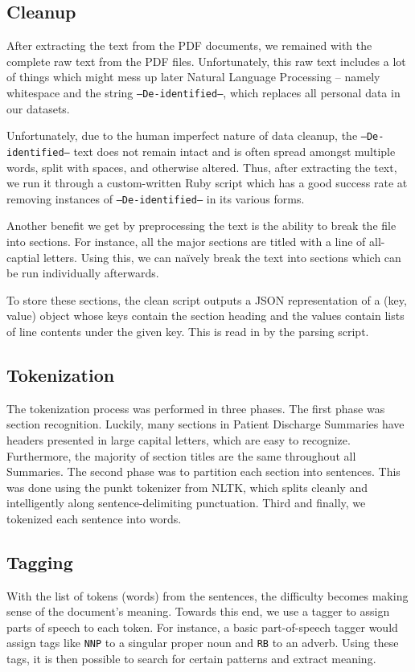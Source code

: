 \documentclass{acm_proc_article-sp}
\begin{document}
\subsection{Cleanup}
After extracting the text from the PDF documents, we remained with the complete raw text from the PDF files.
Unfortunately, this raw text includes a lot of things which might mess up later Natural Language Processing --
namely whitespace and the string \texttt{--De-identified--}, which replaces all personal data in our datasets.

Unfortunately, due to the human imperfect nature of data cleanup, the \texttt{--De-identified--} text does not remain
intact and is often spread amongst multiple words, split with spaces, and otherwise altered. Thus, after extracting
the text, we run it through a custom-written Ruby script which has a good success rate at removing instances of 
\texttt{--De-identified--} in its various forms.

Another benefit we get by preprocessing the text is the ability to break the file into sections. For instance,
all the major sections are titled with a line of all-captial letters. Using this, we can na{\"i}vely break the text
into sections which can be run individually afterwards.

To store these sections, the clean script outputs a JSON representation of a (key, value) object whose keys contain the
section heading and the values contain lists of line contents under the given key. This is read in by the parsing
script.

\subsection{Tokenization}
The tokenization process was performed in three phases. The first phase was section
recognition. Luckily, many sections in Patient Discharge Summaries have headers presented
in large capital letters, which are easy to recognize. Furthermore, the majority of
section titles are the same throughout all Summaries. The second phase was to partition
each section into sentences. This was done using the punkt tokenizer from NLTK,
which splits cleanly and intelligently along sentence-delimiting punctuation.
Third and finally, we tokenized each sentence into words.

\subsection{Tagging}
With the list of tokens (words) from the sentences, the difficulty becomes making sense of the 
document's meaning. Towards this end, we use a tagger to assign parts of speech to each
token. For instance, a basic part-of-speech tagger would assign tags like \texttt{NNP} to a
singular proper noun and \texttt{RB} to an adverb. Using these tags, it is then possible to search
for certain patterns and extract meaning.
\end{document}
